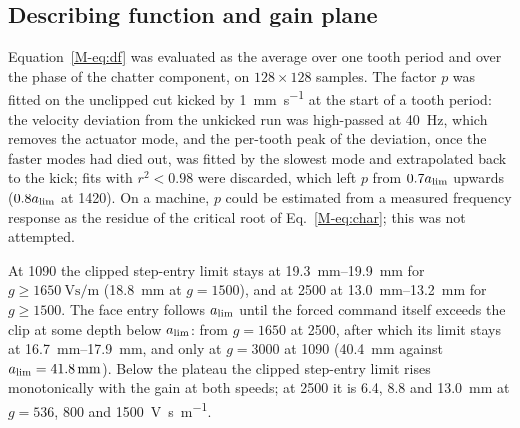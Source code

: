 \subsection{Describing function and gain plane}\label{supp:bistab-df}

Equation~\eqref{M-eq:df} was evaluated as the average over one tooth period and over the phase of the chatter component, on $128\times128$ samples. The factor $p$ was fitted on the unclipped cut kicked by \SI{1}{\milli\metre\per\second} at the start of a tooth period: the velocity deviation from the unkicked run was high-passed at \SI{40}{\hertz}, which removes the actuator mode, and the per-tooth peak of the deviation, once the faster modes had died out, was fitted by the slowest mode and extrapolated back to the kick; fits with $r^2<0.98$ were discarded, which left $p$ from $0.7a_{\lim}$ upwards ($0.8a_{\lim}$ at \SI{1420}{\rpm}). On a machine, $p$ could be estimated from a measured frequency response as the residue of the critical root of Eq.~\eqref{M-eq:char}; this was not attempted.

At \SI{1090}{\rpm} the clipped step-entry limit stays at \SIrange{19.3}{19.9}{\milli\metre} for $g\ge\SI{1650}{\volt\second\per\metre}$ (\SI{18.8}{\milli\metre} at $g=1500$), and at \SI{2500}{\rpm} at \SIrange{13.0}{13.2}{\milli\metre} for $g\ge1500$. The face entry follows $a_{\lim}$ until the forced command itself exceeds the clip at some depth below $a_{\lim}$: from $g=1650$ at \SI{2500}{\rpm}, after which its limit stays at \SIrange{16.7}{17.9}{\milli\metre}, and only at $g=3000$ at \SI{1090}{\rpm} (\SI{40.4}{\milli\metre} against $a_{\lim}=\SI{41.8}{\milli\metre}$). Below the plateau the clipped step-entry limit rises monotonically with the gain at both speeds; at \SI{2500}{\rpm} it is 6.4, 8.8 and \SI{13.0}{\milli\metre} at $g=536$, 800 and \SI{1500}{\volt\second\per\metre}.
